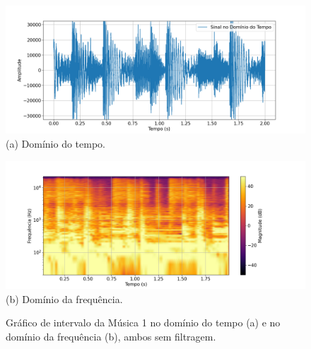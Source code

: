 \begin{figure}[htpb]
    \centering
    \begin{minipage}[b]{0.7\textwidth}
        \centering
        \includegraphics[width=\textwidth]{figuras/fig40.png}
        \vspace{0.3cm} %
        (a) Domínio do tempo.
    \end{minipage}
    \hspace{0.5cm} %

    \begin{minipage}[b]{0.7\textwidth}
        \centering
        \includegraphics[width=\textwidth]{figuras/fig41.png}
        \vspace{0.3cm} %
        (b) Domínio da frequência.
    \end{minipage}

    \caption{Gráfico de intervalo da Música 1 no domínio do tempo (a) e no domínio da frequência (b), ambos sem filtragem.}
    \label{fig40}
\end{figure}








